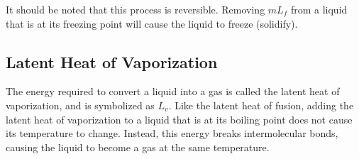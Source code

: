 	It should be noted that this process is reversible.  Removing $mL_f$ from a liquid that is at its freezing point will cause the liquid to freeze (solidify).  
	
	
	\subsection{Latent Heat of Vaporization}
	The energy required to convert a liquid into a gas is called the latent heat of vaporization, and is symbolized as $L_v$.  Like the latent heat of fusion, adding the latent heat of vaporization to a liquid that is at its boiling point does not cause its temperature to change. Instead, this energy breaks intermolecular bonds, causing the liquid to become a gas at the same temperature.   
	

	


